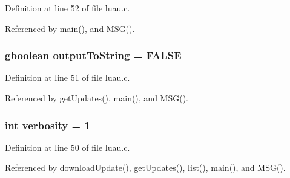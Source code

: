 Definition at line 52 of file luau.c.

Referenced by main(), and MSG().
\subsubsection{\setlength{\rightskip}{0pt plus 5cm}gboolean {\bf output\-To\-String} = FALSE\hspace{0.3cm}{\tt  [static]}}\label{luau_8c_a1}




Definition at line 51 of file luau.c.

Referenced by get\-Updates(), main(), and MSG().
\subsubsection{\setlength{\rightskip}{0pt plus 5cm}int {\bf verbosity} = 1\hspace{0.3cm}{\tt  [static]}}\label{luau_8c_a0}




Definition at line 50 of file luau.c.

Referenced by download\-Update(), get\-Updates(), list(), main(), and MSG().